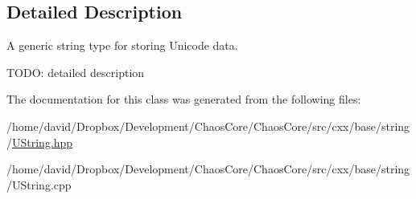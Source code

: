 \subsection{Detailed Description}
A generic string type for storing Unicode data. 

T\-O\-D\-O\-: detailed description 

The documentation for this class was generated from the following files\-:\begin{DoxyCompactItemize}
\item 
/home/david/\-Dropbox/\-Development/\-Chaos\-Core/\-Chaos\-Core/src/cxx/base/string/\hyperlink{_u_string_8hpp}{U\-String.\-hpp}\item 
/home/david/\-Dropbox/\-Development/\-Chaos\-Core/\-Chaos\-Core/src/cxx/base/string/U\-String.\-cpp\end{DoxyCompactItemize}
